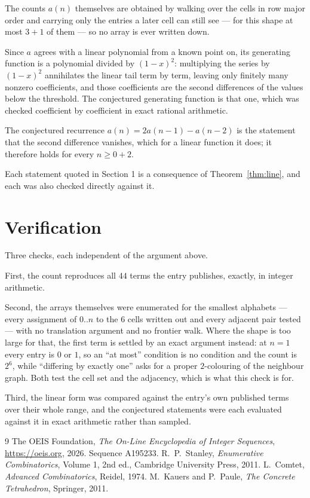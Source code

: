 \documentclass[11pt,a4paper]{article}
\theoremstyle{plain}
\theoremstyle{definition}
\begin{document}
The counts $a(n)$ themselves are obtained by walking over the cells in row major order and
carrying only the entries a later cell can still see --- for this shape at most $3+1$ of
them --- so no array is ever written down.

Since $a$ agrees with a linear polynomial from a known point on, its generating function is a
polynomial divided by $(1-x)^2$: multiplying the series by $(1-x)^2$ annihilates the linear
tail term by term, leaving only finitely many nonzero coefficients, and those coefficients are
the second differences of the values below the threshold. The conjectured generating function
is that one, which was checked coefficient by coefficient in exact rational arithmetic.

The conjectured recurrence $a(n)=2a(n-1)-a(n-2)$ is the statement that the second difference
vanishes, which for a linear function it does; it therefore holds for every $n\ge0+2$.

Each statement quoted in Section 1 is a consequence of Theorem~\ref{thm:line}, and each was
also checked directly against it.

\section{Verification}

Three checks, each independent of the argument above.

First, the count reproduces all $44$ terms the entry publishes, exactly, in integer
arithmetic.

Second, the arrays themselves were enumerated for the smallest alphabets --- every assignment
of $0..n$ to the $6$ cells written out and every adjacent pair tested --- with no
translation argument and no frontier walk. Where the shape is too large for that, the first
term is settled by an exact argument instead: at $n=1$ every entry is $0$ or $1$, so an ``at
most'' condition is no condition and the count is $2^{6}$, while ``differing by exactly
one'' asks for a proper $2$-colouring of the neighbour graph. Both test the cell set and the
adjacency, which is what this check is for.

Third, the linear form was compared against the entry's own published terms over their whole
range, and the conjectured statements were each evaluated against it in exact arithmetic
rather than sampled.

\begin{thebibliography}{9}
 The OEIS Foundation, \emph{The On-Line Encyclopedia of Integer
Sequences}, \url{https://oeis.org}, 2026. Sequence A195233.
 R.~P.~Stanley, \emph{Enumerative Combinatorics}, Volume 1, 2nd ed.,
Cambridge University Press, 2011.
 L.~Comtet, \emph{Advanced Combinatorics}, Reidel, 1974.
 M.~Kauers and P.~Paule, \emph{The Concrete Tetrahedron}, Springer, 2011.
\end{thebibliography}
\end{document}
